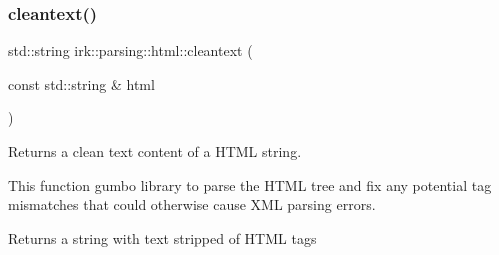 \subsubsection{\texorpdfstring{cleantext()}{cleantext()}\hspace{0.1cm}{\footnotesize\ttfamily [2/2]}}
{\footnotesize\ttfamily std\+::string irk\+::parsing\+::html\+::cleantext (\begin{DoxyParamCaption}\item[{const std\+::string \&}]{html }\end{DoxyParamCaption})}



Returns a clean text content of a H\+T\+ML string. 

This function gumbo library to parse the H\+T\+ML tree and fix any potential tag mismatches that could otherwise cause X\+ML parsing errors. \begin{DoxyReturn}{Returns}
a string with text stripped of H\+T\+ML tags 
\end{DoxyReturn}
